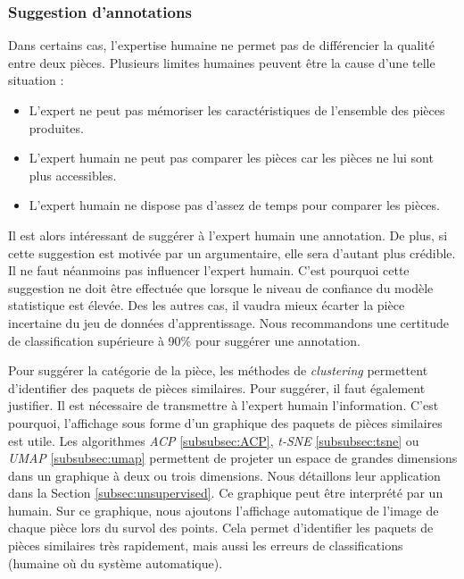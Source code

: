 \subsubsection{Suggestion d'annotations}
Dans certains cas, l'expertise humaine ne permet pas de différencier la qualité entre deux pièces.
Plusieurs limites humaines peuvent être la cause d'une telle situation :
\begin{itemize}
    \item L'expert ne peut pas mémoriser les caractéristiques de l'ensemble des pièces produites.
    \item L'expert humain ne peut pas comparer les pièces car les pièces ne lui sont plus accessibles.
    \item L'expert humain ne dispose pas d'assez de temps pour comparer les pièces.
\end{itemize}

Il est alors intéressant de suggérer à l'expert humain une annotation.
De plus, si cette suggestion est motivée par un argumentaire, elle sera d'autant plus crédible.
Il ne faut néanmoins pas influencer l'expert humain.
C'est pourquoi cette suggestion ne doit être effectuée que lorsque le niveau de confiance du modèle statistique est élevée.
Des les autres cas, il vaudra mieux écarter la pièce incertaine du jeu de données d'apprentissage.
Nous recommandons une certitude de classification supérieure à 90\% pour suggérer une annotation.

Pour suggérer la catégorie de la pièce, les méthodes de \textit{clustering} permettent d'identifier des paquets de pièces similaires.
Pour suggérer, il faut également justifier.
Il est nécessaire de transmettre à l'expert humain l'information.
C'est pourquoi, l'affichage sous forme d'un graphique des paquets de pièces similaires est utile.
Les algorithmes \textit{ACP} \ref{subsubsec:ACP}, \textit{t-SNE} \ref{subsubsec:tsne} ou \textit{UMAP} \ref{subsubsec:umap} permettent de projeter un espace de grandes dimensions dans un graphique à deux ou trois dimensions.
Nous détaillons leur application dans la Section \ref{subsec:unsupervised}.
Ce graphique peut être interprété par un humain.
Sur ce graphique, nous ajoutons l'affichage automatique de l'image de chaque pièce lors du survol des points.
Cela permet d'identifier les paquets de pièces similaires très rapidement, mais aussi les erreurs de classifications (humaine où du système automatique).


